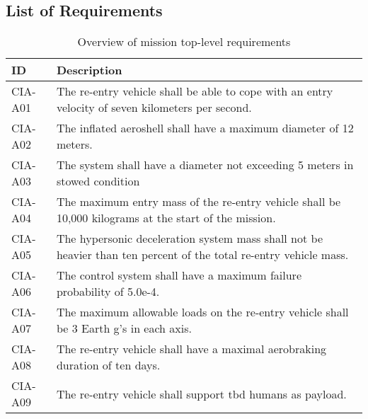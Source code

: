 \subsection{List of Requirements} \label{sec:list}

\begin{table}[H]
	\caption{Overview of mission top-level requirements}
	\begin{tabular}{|p{}|p{}|}
    \hline
    ID          & Description                                                                                                      \\ \hline \hline
    CIA-A01 & The re-entry vehicle shall be able to cope with an entry velocity of seven kilometers per second.                \\ \hline
    CIA-A02 & The inflated aeroshell shall have a maximum diameter of 12 meters.                                               \\ \hline
    CIA-A03 & The system shall have a diameter not exceeding 5 meters in stowed condition                                       \\ \hline
    CIA-A04 & The maximum entry mass of the re-entry vehicle shall be 10,000 kilograms at the start of the mission.				\\ \hline
    CIA-A05 & The hypersonic deceleration system mass shall not be heavier than ten percent of the total re-entry vehicle mass. \\ \hline
    CIA-A06 & The control system shall have a maximum failure probability of 5.0e-4.                                           \\ \hline
    CIA-A07 & The maximum allowable loads on the re-entry vehicle shall be 3 Earth g's in each axis.                            \\ \hline
    CIA-A08 & The re-entry vehicle shall have a maximal aerobraking duration of ten days.                                      \\ \hline
    CIA-A09 & The re-entry vehicle shall support \gls{tbd} humans as payload.                         				            \\ \hline
    \end{tabular}
    \label{tab:toplevelreq}
\end{table}